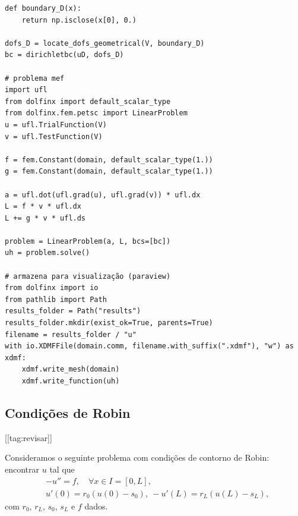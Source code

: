 \begin{ex}
\begin{lstlisting}[caption=ex\_mef1d\_neumann\_nh.py]
def boundary_D(x):
    return np.isclose(x[0], 0.)

dofs_D = locate_dofs_geometrical(V, boundary_D)
bc = dirichletbc(uD, dofs_D)

# problema mef
import ufl
from dolfinx import default_scalar_type
from dolfinx.fem.petsc import LinearProblem
u = ufl.TrialFunction(V)
v = ufl.TestFunction(V)

f = fem.Constant(domain, default_scalar_type(1.))
g = fem.Constant(domain, default_scalar_type(1.))

a = ufl.dot(ufl.grad(u), ufl.grad(v)) * ufl.dx
L = f * v * ufl.dx
L += g * v * ufl.ds

problem = LinearProblem(a, L, bcs=[bc])
uh = problem.solve()

# armazena para visualização (paraview)
from dolfinx import io
from pathlib import Path
results_folder = Path("results")
results_folder.mkdir(exist_ok=True, parents=True)
filename = results_folder / "u"
with io.XDMFFile(domain.comm, filename.with_suffix(".xdmf"), "w") as xdmf:
    xdmf.write_mesh(domain)
    xdmf.write_function(uh)
\end{lstlisting}

\end{ex} 

\subsection{Condições de Robin}
[[tag:revisar]]

Consideramos o seguinte problema com condições de contorno de Robin{\robin}: encontrar $u$ tal que
\begin{align}
  &-u'' = f,\quad \forall x\in I=[0, L],\label{eq:cc_r_eq}\\
  &u'(0) = r_0(u(0)-s_0),~ -u'(L) = r_L(u(L)-s_L),\label{eq:cc_r_bc}
\end{align}
com $r_0$, $r_L$, $s_0$, $s_L$ e $f$ dados.

